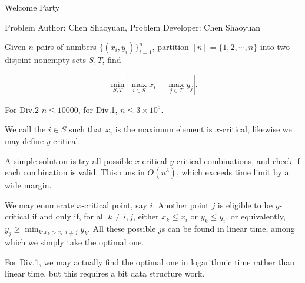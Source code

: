 \begin{Solution}{Welcome Party}

\begin{frame}{\ProblemName}

\small Problem Author: Chen Shaoyuan, Problem Developer: Chen Shaoyuan \par \vspace{0.3cm}


Given $n$ pairs of numbers $\{(x_i, y_i)\}_{i=1}^n$, partition $[n] = \{1, 2, \cdots, n\}$ into two disjoint nonempty sets $S, T$, find

$$ \min_{S, T} | \max_{i \in S} x_i - \max_{j \in T} y_j | . $$

For Div.2 $n \leq 10000$, for Div.1, $n \leq 3 \times 10^5$.

\pause

We call the $i \in S$ such that $x_i$ is the maximum element is $x$-critical; likewise we may define $y$-critical.

\pause

A simple solution is try all possible $x$-critical $y$-critical combinations, and check if each combination is valid. This runs in $O(n^3)$, which exceeds time limit by a wide margin.

\end{frame}

\begin{frame}{\ProblemName}

We may enumerate $x$-critical point, say $i$. Another point $j$ is eligible to be $y$-critical if and only if, for all $k \neq i, j$, either $x_k \leq x_i$ or $y_k \leq y_i$, or equivalently, $y_j \geq \min_{k : x_k > x_i, i \neq j}{y_k}$. All these possible $j$s can be found in linear time, among which we simply take the optimal one.

For Div.1, we may actually find the optimal one in logarithmic time rather than linear time, but this requires a bit data structure work.

\end{frame}

\end{Solution}

